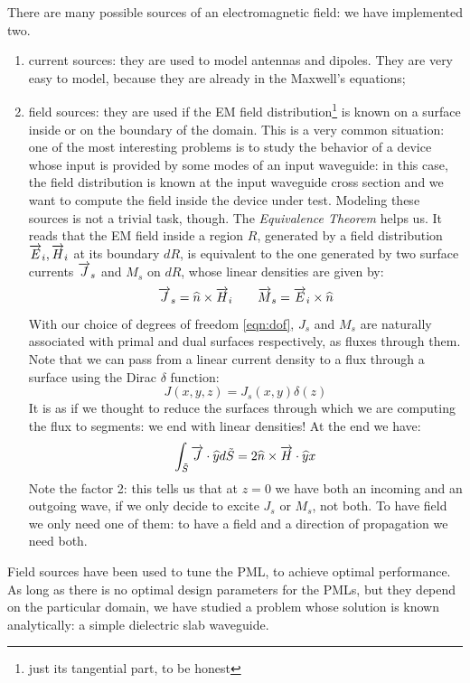 There are many possible sources of an electromagnetic field: we have
implemented two.
\begin{enumerate}
\item
  current sources: they are used to model antennas and dipoles. They are very
  easy to model, because they are already in the Maxwell's equations;
\item
  field sources: they are used if the EM field
  distribution\footnote{just its tangential part, to be honest} is
  known on a surface inside or on the boundary of the domain. This is
  a very common situation: one of the most interesting problems is to
  study the behavior of a device whose input is provided by some
  modes of an input waveguide: in this case, the field distribution is
  known at the input waveguide cross section and we want to compute
  the field inside the device under test. Modeling these sources is
  not a trivial task, though. The \emph{Equivalence Theorem}
  \cite{someda_electromagnetic} helps us. It reads that the EM field
  inside a region $R$, generated by a field distribution ${\overrightarrow{E}_i,\overrightarrow{H}_i}$
  at its boundary $dR$, is equivalent to the one generated by two
  surface currents $\overrightarrow{J}_s$ and $M_s$ on $dR$, whose linear densities are
  given by:
  $$
  \overrightarrow{J}_s = {\widehat{n} \times \overrightarrow{H}_i} \qquad \overrightarrow{M}_s =
  {\overrightarrow{E}_i \times \widehat{n}}
  $$
  With our choice of degrees of freedom \eqref{eqn:dof}, $J_s$ and $M_s$
  are naturally associated with primal and dual surfaces respectively,
  as fluxes through them. Note that we can pass from a linear current
  density to a flux through a surface using the Dirac $\delta$
  function:
  $$
  J(x,y,z) = J_s(x,y) \delta(z)
  $$
  It is as if we thought to reduce the surfaces through which we are
  computing the flux to segments: we end with linear densities! At the
  end we have:
  $$
  \int_{\tilde{S}}{{\overrightarrow{J} \cdot \widehat{y}}d\tilde{S}} =
  2{{\widehat{n} \times \overrightarrow{H}} \cdot \widehat{y}}x
  $$
  Note the factor 2: this tells us that at $z = 0$ we have both an
  incoming and an outgoing wave, if we only decide to excite $J_s$ or
  $M_s$, not both. To have field we only need one of them: to have a
  field and a direction of propagation we need both.
\end{enumerate}

Field sources have been used to tune the PML, to achieve optimal
performance. As long as there is no optimal design parameters for the
PMLs, but they depend on the particular domain, we have studied a
problem whose solution is known analytically: a simple dielectric slab
waveguide.

